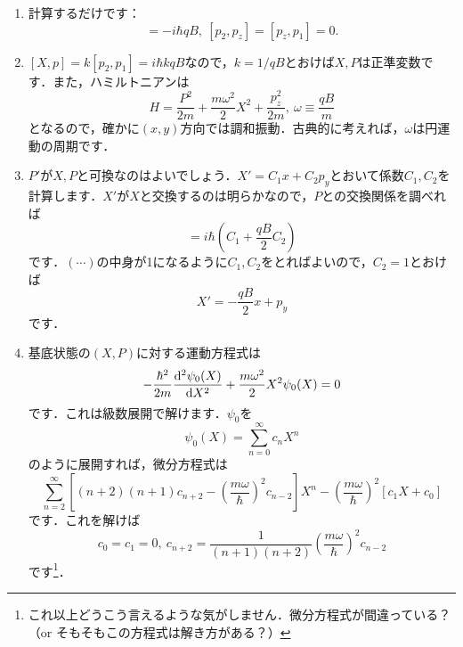 \documentclass[a4paper,pdflatex,ja=standard]{bxjsarticle}
\begin{document}
\begin{enumerate}
  \item
  
  計算するだけです：
  \begin{equation}
    [p_1,p_2]
    =
    -i\hbar qB
    ,\ 
    [p_2,p_z]
    =
    [p_z,p_1]
    =
    0
    .
  \end{equation}


  \item

  $[X,p]=k[p_2,p_1]=i\hbar kqB$なので，$k=1/qB$とおけば$X,P$は正準変数です．また，ハミルトニアンは
  \begin{equation}
    H
    =
    \frac{P^2}{2m}
    +
    \frac{m\omega^2}{2}X^2
    +
    \frac{p_z^2}{2m}
    ,\ 
    \omega
    \equiv
    \frac{qB}{m}
  \end{equation}
  となるので，確かに$(x,y)$方向では調和振動．古典的に考えれば，$\omega$は円運動の周期です．


  \item 

  $P'$が$X,P$と可換なのはよいでしょう．$X'=C_1 x+C_2 p_y$とおいて係数$C_1,C_2$を計算します．$X'$が$X$と交換するのは明らかなので，$P$との交換関係を調べれば
  \begin{equation}
    [X',P]
    =
    i\hbar
    \left(  
      C_1
      +
      \frac{qB}{2}C_2
    \right)
  \end{equation}
  です．$(\cdots)$の中身が1になるように$C_1,C_2$をとればよいので，$C_2=1$とおけば
  \begin{equation}
    X'
    =
    -\frac{qB}{2}x
    +
    p_y
  \end{equation}
  です．


  \item  

  基底状態の$(X,P)$に対する運動方程式は
  \begin{equation}
    -\frac{\hbar^2}{2m}
    \dv[2]{\psi_0(X)}{X}
    +
    \frac{m\omega^2}{2}X^2\psi_0(X)
    =
    0
  \end{equation}
  です．これは級数展開で解けます．$\psi_0$を
  \begin{equation}
    \psi_0(X)
    =
    \sum_{n=0}^{\infty}
    c_n X^n
  \end{equation}
  のように展開すれば，微分方程式は
  \begin{equation}
    \sum_{n=2}^{\infty}
    \left[  
      (n+2)(n+1)c_{n+2}
      -
      \left( \frac{m\omega}{\hbar} \right)^2
      c_{n-2}
    \right]
    X^n
    -
    \left(  
      \frac{m\omega}{\hbar} 
    \right)^2
    \left[  
      c_1 X+c_0
    \right]
  \end{equation}
  です．これを解けば
  \begin{equation}
    c_0=c_1=0
    ,\ 
    c_{n+2}
    =
    \frac{1}{(n+1)(n+2)}
    \left(  
      \frac{m\omega}{\hbar} 
    \right)^2
    c_{n-2}
  \end{equation}
  です\footnote{
    これ以上どうこう言えるような気がしません．微分方程式が間違っている？（or そもそもこの方程式は解き方がある？）
  }．


\end{enumerate}
\end{document}

